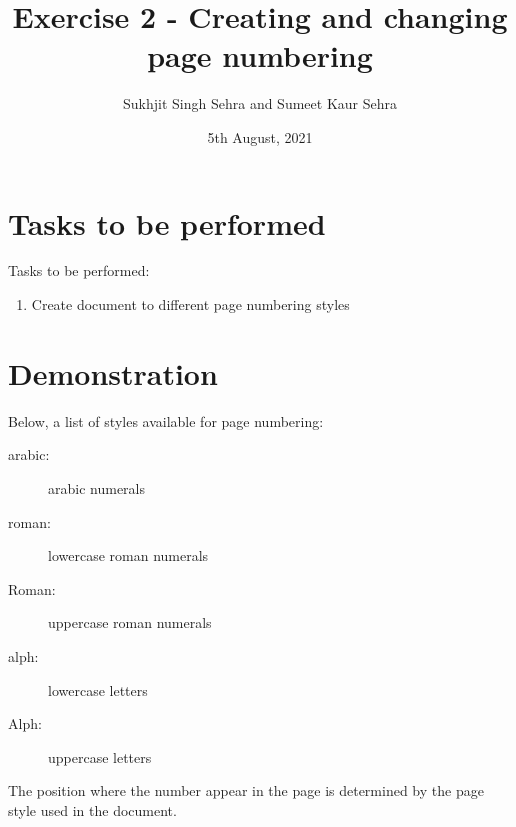 \documentclass{article}
\title{Exercise 2 - Creating and changing page numbering}
\author{Sukhjit Singh Sehra and Sumeet Kaur Sehra}
\date{5th August, 2021}
\begin{document}
\maketitle
	
\section*{Tasks to be performed}
Tasks to be performed:
\begin{enumerate}
		\item Create document to different page numbering styles
	\end{enumerate}
	\section*{Demonstration}

Below, a list of styles available for page numbering:


\begin{description}
\item[arabic:] arabic numerals

\item[roman:] lowercase roman numerals

\item[Roman:] uppercase roman numerals

\item[alph:] lowercase letters

\item[Alph:] uppercase letters
\end{description}

The position where the number appear in the page is determined by the
page style used in the document.
\end{document}
